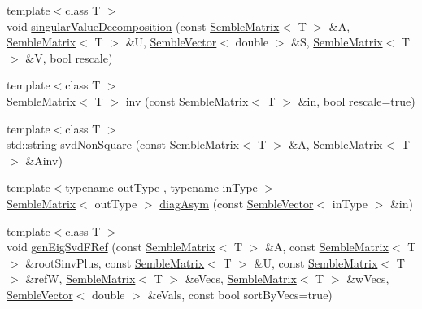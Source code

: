\begin{DoxyCompactItemize}
\item 
{\footnotesize template$<$class T $>$ }\\void \mbox{\hyperlink{namespaceSEMBLE_ab1fb9dc27b7697519b6ae677ce6cc545}{singular\+Value\+Decomposition}} (const \mbox{\hyperlink{structSEMBLE_1_1SembleMatrix}{Semble\+Matrix}}$<$ T $>$ \&A, \mbox{\hyperlink{structSEMBLE_1_1SembleMatrix}{Semble\+Matrix}}$<$ T $>$ \&U, \mbox{\hyperlink{structSEMBLE_1_1SembleVector}{Semble\+Vector}}$<$ double $>$ \&S, \mbox{\hyperlink{structSEMBLE_1_1SembleMatrix}{Semble\+Matrix}}$<$ T $>$ \&V, bool rescale)
\item 
{\footnotesize template$<$class T $>$ }\\\mbox{\hyperlink{structSEMBLE_1_1SembleMatrix}{Semble\+Matrix}}$<$ T $>$ \mbox{\hyperlink{namespaceSEMBLE_a263c9c3830d08488f8ec27c0d728223e}{inv}} (const \mbox{\hyperlink{structSEMBLE_1_1SembleMatrix}{Semble\+Matrix}}$<$ T $>$ \&in, bool rescale=true)
\item 
{\footnotesize template$<$class T $>$ }\\std\+::string \mbox{\hyperlink{namespaceSEMBLE_a866079e585b77c937ef4241e6c2f72be}{svd\+Non\+Square}} (const \mbox{\hyperlink{structSEMBLE_1_1SembleMatrix}{Semble\+Matrix}}$<$ T $>$ \&A, \mbox{\hyperlink{structSEMBLE_1_1SembleMatrix}{Semble\+Matrix}}$<$ T $>$ \&Ainv)
\item 
{\footnotesize template$<$typename out\+Type , typename in\+Type $>$ }\\\mbox{\hyperlink{structSEMBLE_1_1SembleMatrix}{Semble\+Matrix}}$<$ out\+Type $>$ \mbox{\hyperlink{namespaceSEMBLE_a2e8cffa16ed652b97591f844ab63621e}{diag\+Asym}} (const \mbox{\hyperlink{structSEMBLE_1_1SembleVector}{Semble\+Vector}}$<$ in\+Type $>$ \&in)
\item 
{\footnotesize template$<$class T $>$ }\\void \mbox{\hyperlink{namespaceSEMBLE_a9e560b53e88c45058e9898709cf084b3}{gen\+Eig\+Svd\+F\+Ref}} (const \mbox{\hyperlink{structSEMBLE_1_1SembleMatrix}{Semble\+Matrix}}$<$ T $>$ \&A, const \mbox{\hyperlink{structSEMBLE_1_1SembleMatrix}{Semble\+Matrix}}$<$ T $>$ \&root\+Sinv\+Plus, const \mbox{\hyperlink{structSEMBLE_1_1SembleMatrix}{Semble\+Matrix}}$<$ T $>$ \&U, const \mbox{\hyperlink{structSEMBLE_1_1SembleMatrix}{Semble\+Matrix}}$<$ T $>$ \&refW, \mbox{\hyperlink{structSEMBLE_1_1SembleMatrix}{Semble\+Matrix}}$<$ T $>$ \&e\+Vecs, \mbox{\hyperlink{structSEMBLE_1_1SembleMatrix}{Semble\+Matrix}}$<$ T $>$ \&w\+Vecs, \mbox{\hyperlink{structSEMBLE_1_1SembleVector}{Semble\+Vector}}$<$ double $>$ \&e\+Vals, const bool sort\+By\+Vecs=true)

\end{DoxyCompactItemize}
